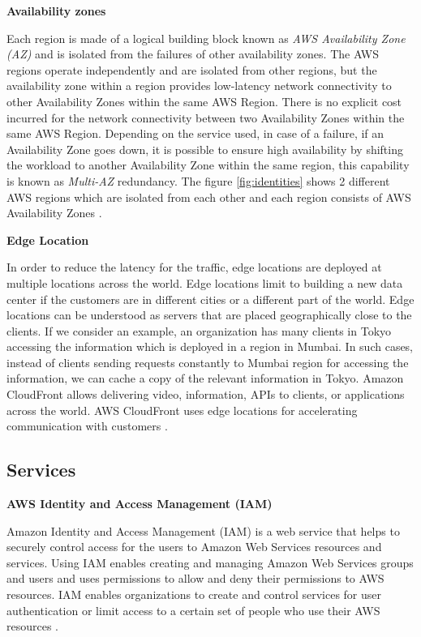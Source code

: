 \textbf{Availability zones}
\par Each region is made of a logical building block known as \textit{AWS Availability Zone (AZ)} and is isolated from the failures of other availability zones. The AWS regions operate independently and are isolated from other regions, but the availability zone within a region provides low-latency network connectivity to other Availability Zones within the same AWS Region. There is no explicit cost incurred for the network connectivity between two Availability Zones within the same AWS Region. Depending on the service used, in case of a failure, if an Availability Zone goes down, it is possible to ensure high availability by shifting the workload to another Availability Zone within the same region, this capability is known as \textit{Multi-AZ} redundancy. The figure \ref{fig:identities} shows 2 different AWS regions which are isolated from each other and each region consists of AWS Availability Zones \cite{21}.

\textbf{Edge Location}
\par In order to reduce the latency for the traffic, edge locations are deployed at multiple locations across the
world. Edge locations limit to building a new data center if the customers are in different cities or a different
part of the world. Edge locations can be understood as servers that are placed geographically close to the clients.
If we consider an example, an organization has many clients in Tokyo accessing the information which is deployed in a
region in Mumbai. In such cases, instead of clients sending requests constantly to Mumbai region for accessing the
information, we can cache a copy of the relevant information in Tokyo. Amazon CloudFront allows delivering video,
information, APIs to clients, or applications across the world. AWS CloudFront uses edge locations for accelerating
communication with customers \cite{22}.

\subsection{Services}

\textbf{AWS Identity and Access Management (IAM)}

\par Amazon Identity and Access Management (IAM) is a web service that helps to securely control access for the users to Amazon Web Services resources and services. Using IAM enables creating and managing Amazon Web Services groups and users and uses permissions to allow and deny their permissions to AWS resources. IAM enables organizations to create and control services for user authentication or limit access to a certain set of people who use their AWS resources \cite{23}.


